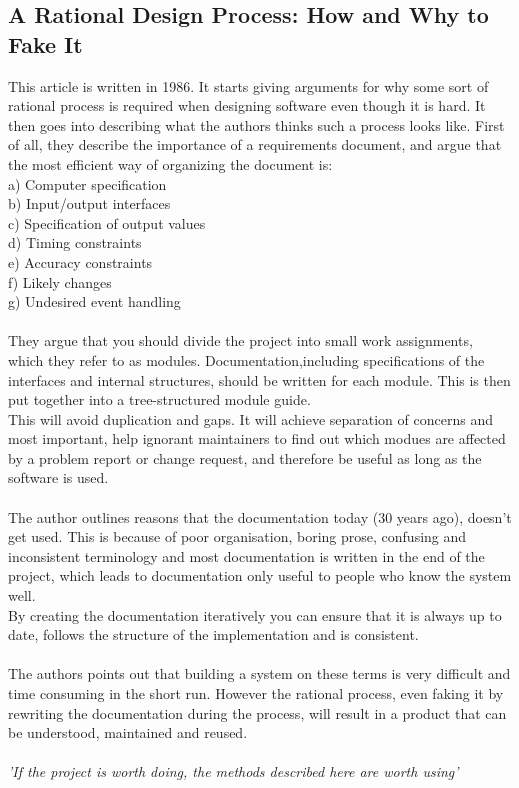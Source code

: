 \documentclass[12pt]{article}
\begin{document}
\subsection*{A Rational Design Process: How and Why to Fake It}

This article is written in 1986. It starts giving arguments for why some sort of rational process is required when designing software even though it is hard. It then goes into describing what the authors thinks such a process looks like.
First of all, they describe the importance of a requirements document, and argue that the most efficient way of organizing the document is:\\
a) Computer specification\\
b) Input/output interfaces\\
c) Specification of output values\\
d) Timing constraints\\
e) Accuracy constraints\\
f) Likely changes\\
g) Undesired event handling\\\\ 
They argue that you should divide the project into small work assignments, which they refer to as modules. Documentation,including specifications of the interfaces and internal structures, should be written for each module. This is then put together into a tree-structured module guide.\\
This will avoid duplication and gaps. It will achieve separation of concerns and most important, help ignorant maintainers to find out which modues are affected by a problem report or change request, and therefore be useful as long as the software is used.\\\\
The author outlines reasons that the documentation today (30 years ago), doesn't get used. This is because of poor organisation, boring prose, confusing and inconsistent terminology and most documentation is written in the end of the project, which leads to documentation only useful to people who know the system well.\\
By creating the documentation iteratively you can ensure that it is always up to date, follows the structure of the implementation and is consistent.\\\\
The authors points out that building a system on these terms is very difficult and time consuming in the short run. However the rational process, even faking it by rewriting the documentation during the process, will result in a product that can be understood, maintained and reused.\\\\
\textit{'If the project is worth doing, the methods described here are worth using'}
\end{document}
